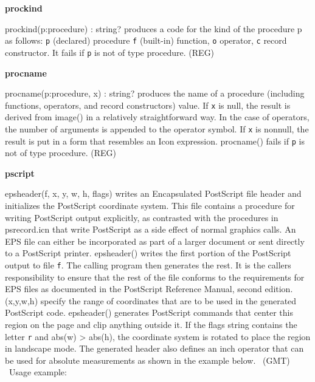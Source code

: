 {\sffamily\bfseries
prockind}

\textsf{prockind(p:procedure) : string?} produces a code for the kind of
the procedure p as follows: \texttt{{\textquotedbl}p{\textquotedbl}}
(declared) procedure \texttt{{\textquotedbl}f{\textquotedbl}}
(built-in) function, \texttt{{\textquotedbl}o{\textquotedbl}} operator,
\texttt{{\textquotedbl}c{\textquotedbl}} record
constructor. It fails if \texttt{p} is not of type
procedure. (REG)

{\sffamily\bfseries
procname}

\textsf{procname(p:procedure, x) : string?} produces the name of a
procedure (including functions, operators, and record
constructors) value. If \texttt{x} is null,
the result is derived from \textsf{image()} in a relatively
straightforward way. In the case of operators, the number of arguments
is appended to the operator symbol. If \texttt{x} is nonnull, the
result is put in a form that resembles an Icon expression.
\textsf{procname()} fails if \texttt{p} is not of type procedure. (REG)

{\sffamily\bfseries
pscript}

\textsf{epsheader(f, x, y, w, h, flags)} writes an Encapsulated
PostScript file header and initializes the PostScript coordinate
system. This file contains a procedure for writing PostScript output
explicitly, as contrasted with the procedures in psrecord.icn that
write PostScript as a side effect of normal graphics calls. An EPS file
can either be incorporated as part of a larger document or sent
directly to a PostScript printer. \textsf{epsheader()} writes the first
portion of the PostScript output to file \texttt{f}. The calling
program then generates the rest. It is the caller{\textquotesingle}s
responsibility to ensure that the rest of the file conforms to the
requirements for EPS files as documented in the PostScript Reference
Manual, second edition. (x,y,w,h) specify the range of coordinates that
are to be used in the generated PostScript code. \textsf{epsheader()}
generates PostScript commands that center this region
on the page and clip anything outside it. If the flags string contains
the letter \texttt{{\textquotedbl}r{\textquotedbl}} and \textsf{abs(w)
{\textgreater} abs(h)}, the coordinate system is rotated to place the
region in {\textquotedbl}landscape{\textquotedbl} mode. The generated
header also defines an {\textquotedbl}inch{\textquotedbl} operator that
can be used for absolute measurements as shown in the example below.
\ (GMT) \ Usage example:

